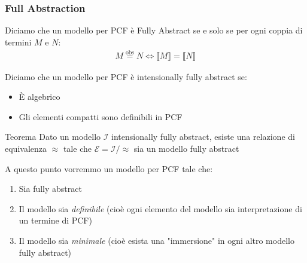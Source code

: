 \documentclass{beamer}
\newcommand{\eqobs}{\stackrel{\text{obs}}{=}}
\begin{document}
\begin{frame}
	
	\frametitle{Full Abstraction}
	
	\begin{block}{}
	Diciamo che un modello per PCF è Fully Abstract se e solo se per ogni coppia di termini $M$ e $N$:
	\begin{gather*}
		M \eqobs N \Leftrightarrow \llbracket M \rrbracket = \llbracket N \rrbracket
	\end{gather*}
	\end{block}
	
	\begin{block}{}
	Diciamo che un modello per PCF è intensionally fully abstract se:
	\begin{itemize}
		\item È algebrico
		\item Gli elementi compatti sono definibili in PCF
	\end{itemize}
	\end{block}
	
	\begin{block}{Teorema}
		Dato un modello $\mathcal{I}$ intensionally fully abstract, esiste una relazione di equivalenza $\approx$ tale che $\mathcal{E}=\mathcal{I}/ \approx$ sia un modello fully abstract
	\end{block}
	

\end{frame}




\begin{frame}
	
	A questo punto vorremmo un modello per PCF tale che:
	\begin{enumerate}
		\item Sia fully abstract
		\item Il modello sia \emph{definibile} (cioè ogni elemento del modello sia interpretazione di un termine di PCF)
		\item Il modello sia \emph{minimale} (cioè esista una "immersione" in ogni altro modello fully abstract)
	\end{enumerate}
	
	

\end{frame}
\end{document}
